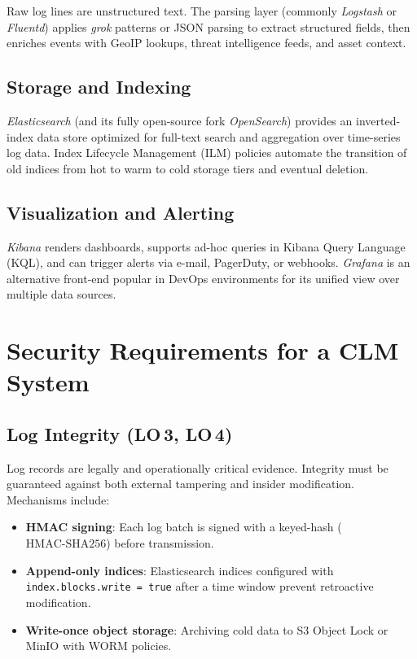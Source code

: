 \documentclass[12pt,a4paper]{report}
\begin{document}
Raw log lines are unstructured text.
The parsing layer (commonly \textit{Logstash} or \textit{Fluentd}) applies \textit{grok}
patterns or JSON parsing to extract structured fields, then enriches events with GeoIP
lookups, threat intelligence feeds, and asset context.

\subsection{Storage and Indexing}

\textit{Elasticsearch} (and its fully open-source fork \textit{OpenSearch}) provides an
inverted-index data store optimized for full-text search and aggregation over time-series
log data.
Index Lifecycle Management (ILM) policies automate the transition of old indices from hot
to warm to cold storage tiers and eventual deletion.

\subsection{Visualization and Alerting}

\textit{Kibana} renders dashboards, supports ad-hoc queries in Kibana Query Language
(KQL), and can trigger alerts via e-mail, PagerDuty, or webhooks.
\textit{Grafana} is an alternative front-end popular in DevOps environments for its unified
view over multiple data sources.

\section{Security Requirements for a CLM System}

\subsection{Log Integrity (LO\,3, LO\,4)}

Log records are legally and operationally critical evidence.
Integrity must be guaranteed against both external tampering and insider modification.
Mechanisms include:

\begin{itemize}[leftmargin=1.5em]
    \item \textbf{HMAC signing}: Each log batch is signed with a keyed-hash
          ($\text{HMAC-SHA256}$) before transmission.
    \item \textbf{Append-only indices}: Elasticsearch indices configured with
          \texttt{index.blocks.write = true} after a time window prevent retroactive
          modification.
    \item \textbf{Write-once object storage}: Archiving cold data to S3 Object Lock or
          MinIO with WORM policies.
\end{itemize}
\end{document}
